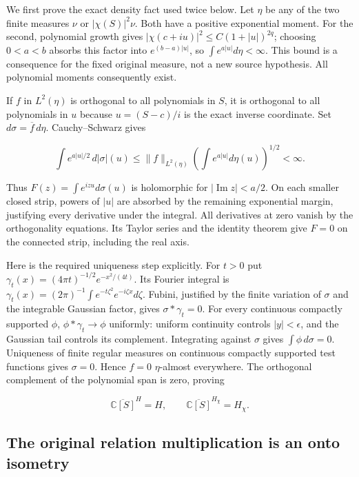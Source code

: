 \documentclass{article}
\begin{document}
We first prove the exact density fact used twice below. Let \(\eta\) be any of the two finite measures \(\nu\) or \(|\chi(S)|^2\nu\). Both have a positive exponential moment. For the second, polynomial growth gives \(|\chi(c+iu)|^2\le C(1+|u|)^{2q}\); choosing \(0<a<b\) absorbs this factor into \(e^{(b-a)|u|}\), so \(\int e^{a|u|}d\eta<\infty\). This bound is a consequence for the fixed original measure, not a new source hypothesis. All polynomial moments consequently exist.

If \(f\) in \(L^2(\eta)\) is orthogonal to all polynomials in \(S\), it is orthogonal to all polynomials in \(u\) because \(u=(S-c)/i\) is the exact inverse coordinate. Set \(d\sigma=\overline f\,d\eta\). Cauchy--Schwarz gives

\[
\int e^{a|u|/2}\,d|\sigma|(u)
\le \|f\|_{L^2(\eta)}\left(\int e^{a|u|}d\eta(u)\right)^{1/2}<\infty.
\tag{CR4}
\]

Thus \(F(z)=\int e^{izu}d\sigma(u)\) is holomorphic for \(|\operatorname{Im}z|<a/2\). On each smaller closed strip, powers of \(|u|\) are absorbed by the remaining exponential margin, justifying every derivative under the integral. All derivatives at zero vanish by the orthogonality equations. Its Taylor series and the identity theorem give \(F=0\) on the connected strip, including the real axis.

Here is the required uniqueness step explicitly. For \(t>0\) put \(\gamma_t(x)=(4\pi t)^{-1/2}e^{-x^2/(4t)}\). Its Fourier integral is \(\gamma_t(x)=(2\pi)^{-1}\int e^{-t\zeta^2}e^{-i\zeta x}d\zeta\). Fubini, justified by the finite variation of \(\sigma\) and the integrable Gaussian factor, gives \(\sigma*\gamma_t=0\). For every continuous compactly supported \(\phi\), \(\phi*\gamma_t\to\phi\) uniformly: uniform continuity controls \(|y|<\epsilon\), and the Gaussian tail controls its complement. Integrating against \(\sigma\) gives \(\int\phi\,d\sigma=0\). Uniqueness of finite regular measures on continuous compactly supported test functions gives \(\sigma=0\). Hence \(f=0\) \(\eta\)-almost everywhere. The orthogonal complement of the polynomial span is zero, proving

\[
\overline{\mathbb C[S]}^{H}=H,\qquad
\overline{\mathbb C[S]}^{H_\chi}=H_\chi.
\tag{CR5}
\]

\subsection{The original relation multiplication is an onto isometry}\label{the-original-relation-multiplication-is-an-onto-isometry}
\end{document}
